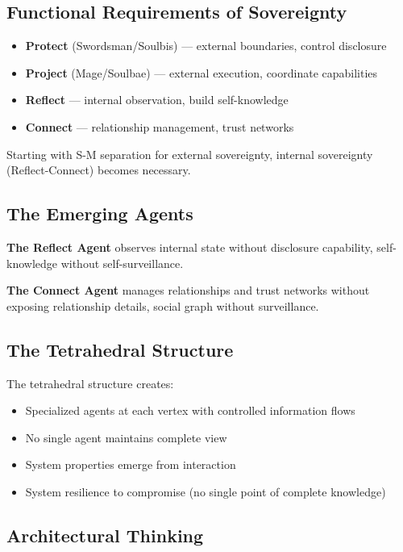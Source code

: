 \documentclass[11pt,a4paper]{article}
\theoremstyle{definition}
\begin{document}
\subsection{Functional Requirements of Sovereignty}

\begin{itemize}
    \item \textbf{Protect} (Swordsman/Soulbis) --- external boundaries, control disclosure
    \item \textbf{Project} (Mage/Soulbae) --- external execution, coordinate capabilities
    \item \textbf{Reflect} --- internal observation, build self-knowledge
    \item \textbf{Connect} --- relationship management, trust networks
\end{itemize}

Starting with S-M separation for external sovereignty, internal sovereignty (Reflect-Connect) becomes necessary.

\subsection{The Emerging Agents}

\textbf{The Reflect Agent} observes internal state without disclosure capability, self-knowledge without self-surveillance.

\textbf{The Connect Agent} manages relationships and trust networks without exposing relationship details, social graph without surveillance.

\subsection{The Tetrahedral Structure}

The tetrahedral structure creates:

\begin{itemize}
    \item Specialized agents at each vertex with controlled information flows
    \item No single agent maintains complete view
    \item System properties emerge from interaction
    \item System resilience to compromise (no single point of complete knowledge)
\end{itemize}

\subsection{Architectural Thinking}
\end{document}
